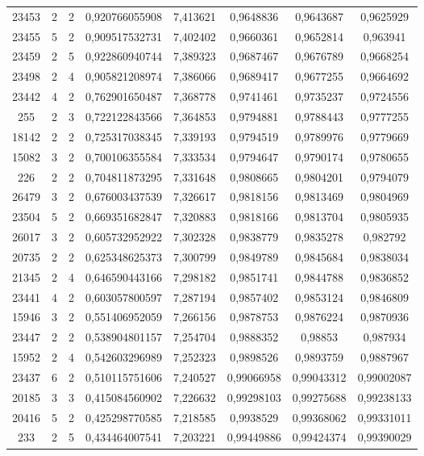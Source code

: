 \begin{longtable}{|c|c|c|c|c|c|c|c|}
23453 & 2 & 2 & 0,920766055908 & 7,413621 & 0,9648836 & 0,9643687 & 0,9625929 \\
23455 & 5 & 2 & 0,909517532731 & 7,402402 & 0,9660361 & 0,9652814 & 0,963941 \\
23459 & 2 & 5 & 0,922860940744 & 7,389323 & 0,9687467 & 0,9676789 & 0,9668254 \\
23498 & 2 & 4 & 0,905821208974 & 7,386066 & 0,9689417 & 0,9677255 & 0,9664692 \\
23442 & 4 & 2 & 0,762901650487 & 7,368778 & 0,9741461 & 0,9735237 & 0,9724556 \\
255 & 2 & 3 & 0,722122843566 & 7,364853 & 0,9794881 & 0,9788443 & 0,9777255 \\
18142 & 2 & 2 & 0,725317038345 & 7,339193 & 0,9794519 & 0,9789976 & 0,9779669 \\
15082 & 3 & 2 & 0,700106355584 & 7,333534 & 0,9794647 & 0,9790174 & 0,9780655 \\
226 & 2 & 2 & 0,704811873295 & 7,331648 & 0,9808665 & 0,9804201 & 0,9794079 \\
26479 & 3 & 2 & 0,676003437539 & 7,326617 & 0,9818156 & 0,9813469 & 0,9804969 \\
23504 & 5 & 2 & 0,669351682847 & 7,320883 & 0,9818166 & 0,9813704 & 0,9805935 \\
26017 & 3 & 2 & 0,605732952922 & 7,302328 & 0,9838779 & 0,9835278 & 0,982792 \\
20735 & 2 & 2 & 0,625348625373 & 7,300799 & 0,9849789 & 0,9845684 & 0,9838034 \\
21345 & 2 & 4 & 0,646590443166 & 7,298182 & 0,9851741 & 0,9844788 & 0,9836852 \\
23441 & 4 & 2 & 0,603057800597 & 7,287194 & 0,9857402 & 0,9853124 & 0,9846809 \\
15946 & 3 & 2 & 0,551406952059 & 7,266156 & 0,9878753 & 0,9876224 & 0,9870936 \\
23447 & 2 & 2 & 0,538904801157 & 7,254704 & 0,9888352 & 0,98853 & 0,987934 \\
15952 & 2 & 4 & 0,542603296989 & 7,252323 & 0,9898526 & 0,9893759 & 0,9887967 \\
23437 & 6 & 2 & 0,510115751606 & 7,240527 & 0,99066958 & 0,99043312 & 0,99002087 \\
20185 & 3 & 3 & 0,415084560902 & 7,226632 & 0,99298103 & 0,99275688 & 0,99238133 \\
20416 & 5 & 2 & 0,425298770585 & 7,218585 & 0,9938529 & 0,99368062 & 0,99331011 \\
233 & 2 & 5 & 0,434464007541 & 7,203221 & 0,99449886 & 0,99424374 & 0,99390029 \\

\end{longtable}

